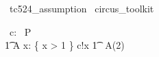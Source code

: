 
\begin{zsection}
 \SECTION\ tc524\_assumption \parents\ circus\_toolkit
\end{zsection}

\begin{circus}
     \circchannel\ c: \nat
     \also
    \circprocess\ P \circdef\ \circbegin \\
       \t1 A \circdef x: \nat \circspot \{ x > 1 \} \circseq c!x \then \Skip
     	\t1 \circspot\ A(2) \\	
     \circend
\end{circus} 


